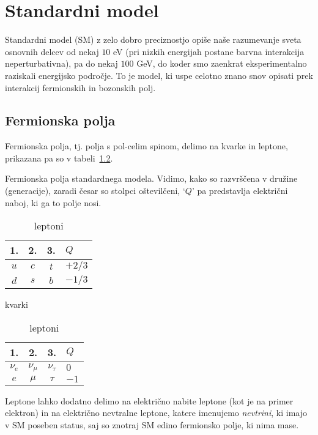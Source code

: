 \chapter{Standardni model}

Standardni model (SM) z zelo dobro preciznostjo opiše naše razumevanje sveta osnovnih delcev od nekaj
$10$ eV (pri nizkih energijah postane barvna interakcija neperturbativna), pa do nekaj $100$ GeV, do
koder smo zaenkrat eksperimentalno raziskali energijsko področje. To je model, ki uspe celotno znano
snov opisati prek interakcij fermionskih in bozonskih polj.

\section{Fermionska polja}
Fermionska polja, tj. polja s pol-celim spinom, delimo na kvarke in leptone, prikazana pa so v
tabeli~\ref{SMdelci}.
\begin{table}[H]\centering
	\caption{Fermionska polja standardnega modela. Vidimo, kako so razvrščena v družine (generacije),
		zaradi česar so stolpci oštevilčeni, `$Q$' pa predstavlja električni naboj, ki ga to polje nosi.}
	\begin{subtable}[H]{0.45\linewidth}\centering
		\begin{tabular}{c c c | l}
			1. & 2. & 3. & $Q$ \\
			\hline
			$u$ & $c$ & $t$ & $+2/3$ \\
			$d$ & $s$ & $b$ & $-1/3$
		\end{tabular}
		\caption{kvarki}
	\end{subtable}
	\begin{subtable}[H]{0.45\linewidth}\centering
		\begin{tabular}{c c c | l}
			1. & 2. & 3. & $Q$ \\
			\hline
			$\nu_e$ & $\nu_\mu$ & $\nu_\tau$ & $0$ \\
			$e$ & $\mu$ & $\tau$ & $-1$
		\end{tabular}
		\caption{leptoni}
	\end{subtable}
	\label{SMdelci}
\end{table}
Leptone lahko dodatno delimo na električno nabite leptone (kot je na primer elektron) in na
električno nevtralne leptone, katere imenujemo \emph{nevtrini}, ki imajo v SM poseben status, saj
so znotraj SM edino fermionsko polje, ki nima mase.

